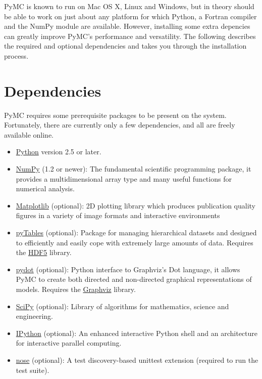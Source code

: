 


PyMC is known to run on Mac OS X, Linux and Windows, but in theory should be
able to work on just about any platform for which Python, a Fortran compiler
and the NumPy module are  available. However, installing some extra
depencies can greatly improve PyMC's performance and versatility.
The following describes the required and optional dependencies and takes you
through the installation process.



\hypertarget{dependencies}{}
\section{Dependencies}
\label{dependencies}

PyMC requires some prerequisite packages to be present on the system.
Fortunately, there are currently only a few dependencies, and all are
freely available online.
\begin{itemize}
\item {} 
\href{http://www.python.org/.}{Python} version 2.5 or later.

\item {} 
\href{http://www.scipy.org/NumPy}{NumPy} (1.2 or newer): The fundamental scientific programming package, it provides a
multidimensional array type and many useful functions for numerical analysis.

\item {} 
\href{http://matplotlib.sourceforge.net/}{Matplotlib} (optional): 2D plotting library which produces publication
quality figures in a variety of image formats and interactive environments

\item {} 
\href{http://www.pytables.org/moin}{pyTables} (optional): Package for managing hierarchical datasets and
designed to efficiently and easily cope with extremely large amounts of data.
Requires the \href{http://www.hdfgroup.org/HDF5/}{HDF5} library.

\item {} 
\href{http://code.google.com/p/pydot/}{pydot} (optional): Python interface to Graphviz's Dot language, it allows
PyMC to create both directed and non-directed graphical representations of models.
Requires the \href{http://www.graphviz.org/}{Graphviz} library.

\item {} 
\href{http://www.scipy.org/}{SciPy} (optional): Library of algorithms for mathematics, science
and engineering.

\item {} 
\href{http://ipython.scipy.org/}{IPython} (optional): An enhanced interactive Python shell and an
architecture for interactive parallel computing.

\item {} 
\href{http://somethingaboutorange.com/mrl/projects/nose/}{nose} (optional): A test discovery-based unittest extension (required
to run the test suite).

\end{itemize}

